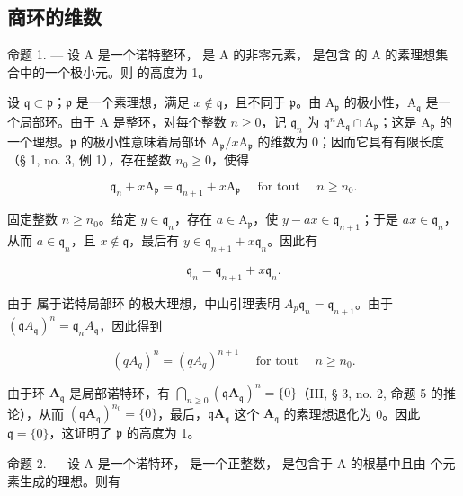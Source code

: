 \subsection{商环的维数}

命题 1. --- 设 A 是一个诺特整环，  是 A 的非零元素，  是包含  的 A 的素理想集合中的一个极小元。则  的高度为 1。

设 \(\mathfrak{q} \subset \mathfrak{p}\)；\(\mathfrak{p}\) 是一个素理想，满足 \(x \notin \mathfrak{q}\)，且不同于 \(\mathfrak{p}\)。由 \(\mathrm{A}_{\mathfrak{p}}\) 的极小性，\(\mathrm{A}_{\mathfrak{q}}\) 是一个局部环。由于 A 是整环，对每个整数 \(n \geqslant 0\)，记 \(\mathfrak{q}_n\) 为 \(\mathfrak{q}^n\mathrm{A}_{\mathfrak{q}} \cap \mathrm{A}_{\mathfrak{p}}\)；这是 \(\mathrm{A}_{\mathfrak{p}}\) 的一个理想。\(\mathfrak{p}\) 的极小性意味着局部环 \(\mathrm{A}_{\mathfrak{p}} / x\mathrm{A}_{\mathfrak{p}}\) 的维数为 0；因而它具有有限长度（§ 1, no. 3, 例 1），存在整数 \(n_0 \geqslant 0\)，使得

\[
\mathfrak {q} _ {n} + x \mathrm{A} _ {\mathfrak {p}} = \mathfrak {q} _ {n + 1} + x \mathrm{A} _ {\mathfrak {p}} \quad \text { for   tout } \quad n \geqslant n _ {0}.\tag{1}
\]

固定整数 \(n \geqslant n_{0}\)。给定 \(y \in \mathfrak{q}_{n}\)，存在 \(a \in \mathrm{A}_{\mathfrak{p}}\)，使 \(y - ax \in \mathfrak{q}_{n+1}\)；于是 \(ax \in \mathfrak{q}_{n}\)，从而 \(a \in \mathfrak{q}_{n}\)，且 \(x \notin \mathfrak{q}\)，最后有 \(y \in \mathfrak{q}_{n+1} + x\mathfrak{q}_{n}\)。因此有

\[
\mathfrak {q} _ {n} = \mathfrak {q} _ {n + 1} + x \mathfrak {q} _ {n}.\tag{2}
\]

由于  属于诺特局部环  的极大理想，中山引理表明 \(A_{p}\)\(\mathfrak{q}_n = \mathfrak{q}_{n+1}\)。由于 \((\mathfrak{q}A_{\mathfrak{q}})^{n} = \mathfrak{q}_{n}A_{\mathfrak{q}}\)，因此得到

\[
(q A _ {q}) ^ {n} = (q A _ {q}) ^ {n + 1} \quad \text { for   tout } \quad n \geqslant n _ {0}.\tag{3}
\]

由于环 \(\mathbf{A}_{\mathfrak{q}}\) 是局部诺特环，有 \(\bigcap_{n\geqslant 0}(\mathfrak{q}\mathbf{A}_{\mathfrak{q}})^n = \{0\}\)（III, § 3, no. 2, 命题 5 的推论），从而 \((\mathfrak{q}\mathbf{A}_{\mathfrak{q}})^{n_0} = \{0\}\)，最后，\(\mathfrak{q}\mathbf{A}_{\mathfrak{q}}\) 这个 \(\mathbf{A}_{\mathfrak{q}}\) 的素理想退化为 0。因此 \(\mathfrak{q} = \{0\}\)，这证明了 \(\mathfrak{p}\) 的高度为 1。

命题 2. --- 设 A 是一个诺特环，  是一个正整数，  是包含于 A 的根基中且由  个元素生成的理想。则有

